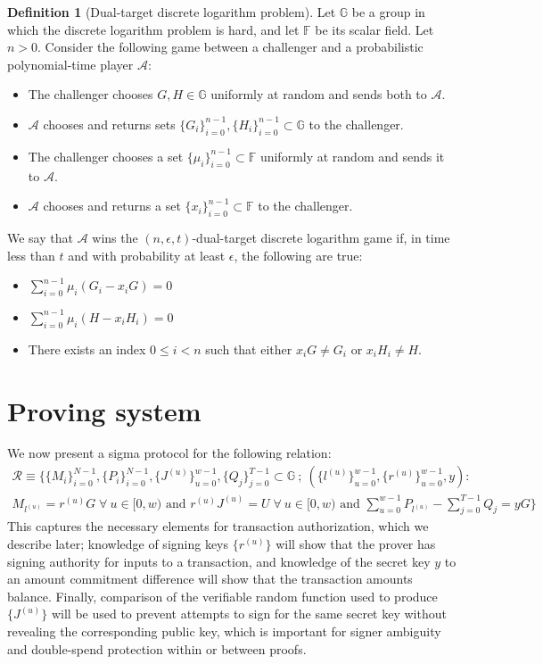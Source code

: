 \documentclass{article}
\newcommand{\G}{\mathbb{G}}
\newcommand{\F}{\mathbb{F}}
\newcommand{\A}{\mathcal{A}}
\newcommand{\sumi}{\sum_{i=0}^{n-1}}
\theoremstyle{definition}
\newtheorem{definition}{Definition}
\begin{document}
\begin{definition}[Dual-target discrete logarithm problem]
\label{def:dual}
Let $\G$ be a group in which the discrete logarithm problem is hard, and let $\F$ be its scalar field.
Let $n > 0$.
Consider the following game between a challenger and a probabilistic polynomial-time player $\A$:
\begin{itemize}
\item The challenger chooses $G,H \in \G$ uniformly at random and sends both to $\A$.
\item $\A$ chooses and returns sets $\{G_i\}_{i=0}^{n-1},\{H_i\}_{i=0}^{n-1} \subset \G$ to the challenger.
\item The challenger chooses a set $\{\mu_i\}_{i=0}^{n-1} \subset \F$ uniformly at random and sends it to $\A$.
\item $\A$ chooses and returns a set $\{x_i\}_{i=0}^{n-1} \subset \F$ to the challenger.
\end{itemize}
We say that $\A$ wins the $(n,\epsilon,t)$-dual-target discrete logarithm game if, in time less than $t$ and with probability at least $\epsilon$, the following are true:
\begin{itemize}
\item $\sumi \mu_i \left( G_i - x_iG \right) = 0$
\item $\sumi \mu_i \left( H - x_iH_i \right) = 0$
\item There exists an index $0 \leq i < n$ such that either $x_iG \neq G_i$ or $x_iH_i \neq H$.
\end{itemize}
\end{definition}


\section{Proving system}
We now present a sigma protocol for the following relation:
\begin{multline*}
\mathcal{R} \equiv \Bigg\{ \{M_i\}_{i=0}^{N-1},\{P_i\}_{i=0}^{N-1},\{J^{(u)}\}_{u=0}^{w-1},\{Q_j\}_{j=0}^{T-1} \subset \G \: ; \: \left( \{l^{(u)}\}_{u=0}^{w-1}, \{r^{(u)}\}_{u=0}^{w-1}, y \right) : \\
M_{l^{(u)}} = r^{(u)}G \; \forall \: u \in [0,w) \text{ and } r^{(u)}J^{(u)} = U \; \forall \: u \in [0,w) \text{ and } \sum_{u=0}^{w-1} P_{l^{(u)}} - \sum_{j=0}^{T-1} Q_j = yG \Bigg\}
\end{multline*}
This captures the necessary elements for transaction authorization, which we describe later; knowledge of signing keys $\{r^{(u)}\}$ will show that the prover has signing authority for inputs to a transaction, and knowledge of the secret key $y$ to an amount commitment difference will show that the transaction amounts balance.
Finally, comparison of the verifiable random function used to produce $\{J^{(u)}\}$ will be used to prevent attempts to sign for the same secret key without revealing the corresponding public key, which is important for signer ambiguity and double-spend protection within or between proofs.
\end{document}
